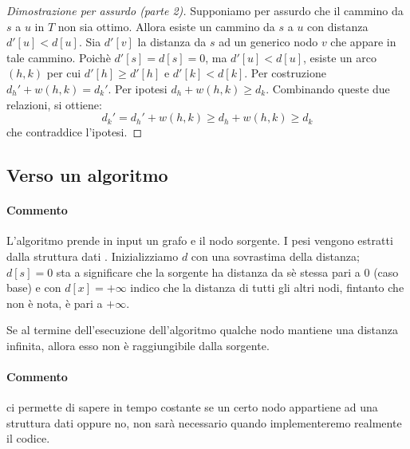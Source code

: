 \begin{proof}[Dimostrazione per assurdo (parte 2)]
Supponiamo per assurdo che il cammino da \(s\) a \(u\) in \(T\) non sia ottimo.
Allora esiste un cammino da \(s\) a \(u\) con distanza \(d'[u]<d[u]\).
Sia \(d'[v]\) la distanza da \(s\) ad un generico nodo \(v\) che appare in tale cammino.
Poichè \(d'[s] = d[s] = 0\), ma \(d'[u]<d[u]\), esiste un arco \((h,k)\) per cui \(d'[h] \geqslant d'[h]\) e \(d'[k]< d[k]\).
Per costruzione \(d_h' + w(h,k) = d_k'\).
Per ipotesi \(d_h + w(h,k) \ge d_k\).
Combinando queste due relazioni, si ottiene:
\begin{equation*}
d_k' = d_h' + w(h,k) \geqslant d_h + w(h,k) \geqslant d_k
\end{equation*}
che contraddice l'ipotesi.
\end{proof}

\subsection{Verso un algoritmo}

\begin{algorithm}[H]
	\caption*{Algoritmo prototipo per il calcolo dei cammini minimi}
	
\end{algorithm}

\paragraph{Commento}
L'algoritmo prende in input un grafo e il nodo sorgente.
I pesi vengono estratti dalla struttura dati \Graph.
Inizializziamo \(d\) con una sovrastima della distanza; \(d[s] = 0\) sta a significare che la sorgente ha distanza da sè stessa pari a 0 (caso base) e con \(d[x] = +\infty\) indico che la distanza di tutti gli altri nodi, fintanto che non è nota, è pari a \(+\infty\).

\begin{note}
Se al termine dell'esecuzione dell'algoritmo qualche nodo mantiene una distanza infinita, allora esso non è raggiungibile dalla sorgente.
\end{note}

\begin{algorithm}[H]
	\caption*{Algoritmo generico per il calcolo dei cammini minimi}
	
\end{algorithm}

\paragraph{Commento}
\Array{\Bool} ci permette di sapere in tempo costante se un certo nodo appartiene ad una struttura dati oppure no, non sarà necessario quando implementeremo realmente il codice.

